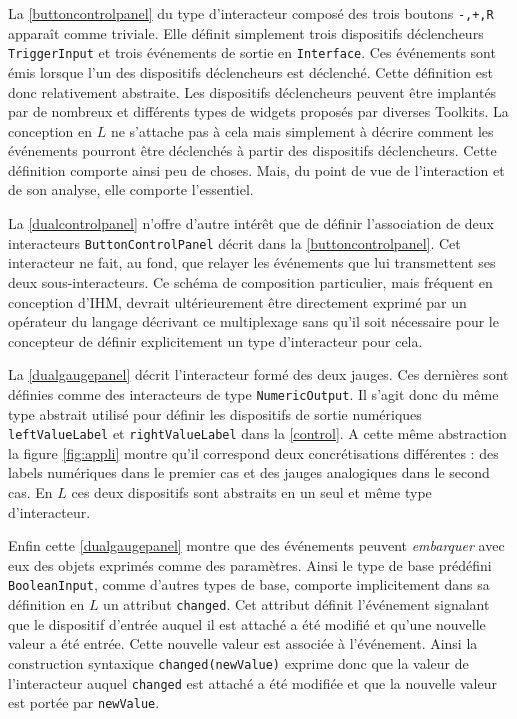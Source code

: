 \documentclass{ihm}
\begin{document}
La  \autoref{buttoncontrolpanel}  du  type d'interacteur  composé  des
trois  boutons \texttt{-,+,R}  apparaît comme  triviale. Elle  définit
simplement trois dispositifs  déclencheurs \lstinline$TriggerInput$ et
trois événements  de sortie en \lstinline$Interface$.   Ces événements
sont  émis lorsque  l'un des  dispositifs déclencheurs  est déclenché.
Cette  définition est  donc relativement  abstraite.  Les  dispositifs
déclencheurs  peuvent être  implantés  par de  nombreux et  différents
types de widgets proposés par  diverses Toolkits. La conception en $L$
ne  s'attache  pas  à  cela  mais simplement  à  décrire  comment  les
événements  pourront   être  déclenchés   à  partir   des  dispositifs
déclencheurs. Cette définition comporte ainsi  peu de choses. Mais, du
point  de  vue de  l'interaction  et  de  son analyse,  elle  comporte
l'essentiel.

La \autoref{dualcontrolpanel}  n'offre d'autre intérêt que  de définir
l'association  de   deux  interacteurs  \lstinline$ButtonControlPanel$
décrit dans la \autoref{buttoncontrolpanel}.  Cet interacteur ne fait,
au  fond, que  relayer les  événements que  lui transmettent  ses deux
sous-interacteurs.   Ce   schéma  de  composition   particulier,  mais
fréquent en conception d'IHM,  devrait ultérieurement être directement
exprimé par  un opérateur  du langage  décrivant ce  multiplexage sans
qu'il soit nécessaire  pour le concepteur de  définir explicitement un
type d'interacteur pour cela.

La  \autoref{dualgaugepanel}  décrit   l'interacteur  formé  des  deux
jauges. Ces  dernières sont  définies comme  des interacteurs  de type
\lstinline$NumericOutput$.   Il  s'agit  donc du  même  type  abstrait
utilisé   pour   définir   les  dispositifs   de   sortie   numériques
\lstinline$leftValueLabel$  et   \lstinline$rightValueLabel$  dans  la
\autoref{control}. A cette même  abstraction la figure \ref{fig:appli}
montre qu'il correspond deux  concrétisations différentes : des labels
numériques  dans le  premier cas  et  des jauges  analogiques dans  le
second cas. En  $L$ ces deux dispositifs sont abstraits  en un seul et
même type d'interacteur. 

Enfin cette \autoref{dualgaugepanel} montre que des événements peuvent
\emph{embarquer}   avec   eux   des    objets   exprimés   comme   des
paramètres. Ainsi le type  de base prédéfini \lstinline$BooleanInput$,
comme  d'autres   types  de  base,  comporte   implicitement  dans  sa
définition  en  $L$  un attribut  \lstinline$changed$.   Cet  attribut
définit l'événement signalant que le dispositif d'entrée auquel il est
attaché a été  modifié et qu'une nouvelle valeur a  été entrée.  Cette
nouvelle  valeur est  associée à  l'événement.  Ainsi  la construction
syntaxique \lstinline$changed(newValue)$ exprime donc que la valeur de
l'interacteur auquel \lstinline$changed$ est attaché a été modifiée et
que la nouvelle valeur est portée par \lstinline$newValue$.
\end{document}
